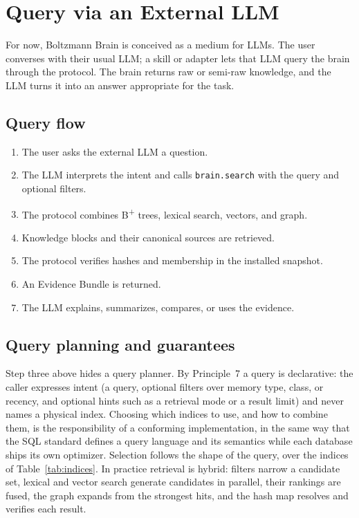 \documentclass[11pt,a4paper]{article}
\begin{document}
\section{Query via an External LLM}
\label{sec:query}

For now, Boltzmann Brain is conceived as a medium for LLMs. The user converses
with their usual LLM; a skill or adapter lets that LLM query the brain through
the protocol. The brain returns raw or semi-raw knowledge, and the LLM turns it into an
answer appropriate for the task.

\subsection{Query flow}

\begin{enumerate}[leftmargin=1.6em]
  \item The user asks the external LLM a question.
  \item The LLM interprets the intent and calls \texttt{brain.search} with the
  query and optional filters.
  \item The protocol combines B\textsuperscript{+} trees, lexical search,
  vectors, and graph.
  \item Knowledge blocks and their canonical sources are retrieved.
  \item The protocol verifies hashes and membership in the installed snapshot.
  \item An Evidence Bundle is returned.
  \item The LLM explains, summarizes, compares, or uses the evidence.
\end{enumerate}

\subsection{Query planning and guarantees}
\label{sec:query-guarantees}

Step three above hides a query planner. By Principle~7 a query is declarative:
the caller expresses intent (a query, optional filters over memory type, class, or recency, and optional hints such as a retrieval mode or a result
limit) and never names a physical index. Choosing which indices to use, and how to combine them, is the responsibility
of a conforming implementation, in the same way that the SQL standard defines
a query language and its semantics while each database ships its own
optimizer. Selection follows the shape of the query, over the indices of
Table~\ref{tab:indices}. In practice retrieval is hybrid: filters narrow a
candidate set, lexical and vector search generate candidates in parallel,
their rankings are fused, the graph expands from the strongest hits, and the
hash map resolves and verifies each result.
\end{document}
